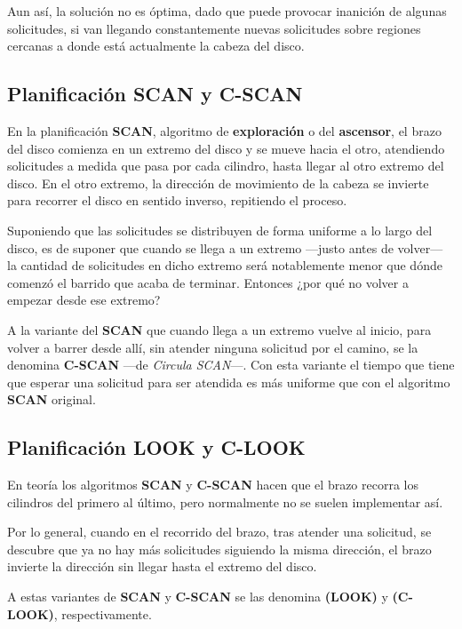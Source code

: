 Aun así, la solución no es óptima, dado que puede provocar inanición de
algunas solicitudes, si van llegando constantemente nuevas solicitudes
sobre regiones cercanas a donde está actualmente la cabeza del disco.

\subsection{Planificación SCAN y
C-SCAN}\label{_planificaciuxf3n_scan_y_c_scan}

{} {} En la planificación \textbf{{}SCAN}, algoritmo de
\textbf{exploración} o del \textbf{ascensor}, el brazo del disco
comienza en un extremo del disco y se mueve hacia el otro, atendiendo
solicitudes a medida que pasa por cada cilindro, hasta llegar al otro
extremo del disco. En el otro extremo, la dirección de movimiento de la
cabeza se invierte para recorrer el disco en sentido inverso, repitiendo
el proceso.

Suponiendo que las solicitudes se distribuyen de forma uniforme a lo
largo del disco, es de suponer que cuando se llega a un extremo ---justo
antes de volver--- la cantidad de solicitudes en dicho extremo será
notablemente menor que dónde comenzó el barrido que acaba de terminar.
Entonces ¿por qué no volver a empezar desde ese extremo?

A la variante del \textbf{SCAN} que cuando llega a un extremo vuelve al
inicio, para volver a barrer desde allí, sin atender ninguna solicitud
por el camino, se la denomina \textbf{{}C-SCAN} ---de \emph{Circula
SCAN}---. Con esta variante el tiempo que tiene que esperar una
solicitud para ser atendida es más uniforme que con el algoritmo
\textbf{SCAN} original.

\subsection{Planificación LOOK y
C-LOOK}\label{_planificaciuxf3n_look_y_c_look}

{} {} En teoría los algoritmos \textbf{SCAN} y \textbf{C-SCAN} hacen que
el brazo recorra los cilindros del primero al último, pero normalmente
no se suelen implementar así.

Por lo general, cuando en el recorrido del brazo, tras atender una
solicitud, se descubre que ya no hay más solicitudes siguiendo la misma
dirección, el brazo invierte la dirección sin llegar hasta el extremo
del disco.

A estas variantes de \textbf{SCAN} y \textbf{C-SCAN} se las denomina
\textbf{(LOOK)} y \textbf{(C-LOOK)}, respectivamente.

